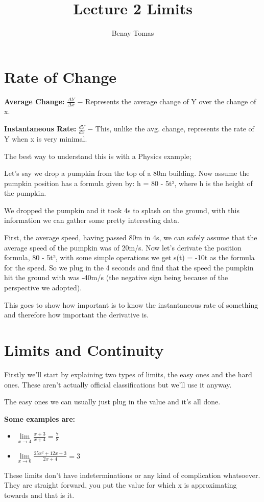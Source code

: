 \documentclass{article}
\title{Lecture 2 Limits}
\author{Benay Tomas}
\begin{document}
\selectfont

\maketitle

\thispagestyle{empty}

\section{Rate of Change}
\textbf{Average Change:} {\large $\frac{\Delta Y}{\Delta x}$} $-$ Represents the average
change of Y over the change of x.

\noindent
\textbf{Instantaneous Rate:} {\large$\frac{dY}{dx}$} $-$ This, unlike the avg. change,
represents the rate of Y when x is very minimal.

The best way to understand this is with a Physics example;

Let's say we drop a pumpkin from the top of a 80m building.
Now assume the pumpkin position has a formula given by: h = 80 - 5t², where
h is the height of the pumpkin.

We dropped the pumpkin and it took 4s to splash on the ground, with this
information we can gather some pretty interesting data. 

First, the average speed, having passed 80m in 4s, we can safely assume
that the average speed of the pumpkin was of 20m/s. Now let's derivate
the position formula, 80 - 5t², with some simple operations we get
s(t) = -10t as the formula for the speed. So we plug in the 4 seconds and
find that the speed the pumpkin hit the ground with was -40m/s (the negative
sign being because of the perspective we adopted).

This goes to show how important is to know the instantaneous rate of something
and therefore how important the derivative is.

\section{Limits and Continuity}
Firstly we'll start by explaining two types of limits, the easy ones and the
hard ones. These aren't actually official classifications but we'll use it
anyway.

The easy ones we can usually just plug in the value and it's all done.

\textbf{Some examples are:}

{\large
\begin{itemize}
    \item[] $\lim\limits_{x \to 4} \frac{x+3}{x+4} =  \frac{7}{8}$
    \item[] $\lim\limits_{x \to 0} \frac{25x^{2} + 12x + 3}{2x + 4} = 3$
\end{itemize}
}
These limits don't have indeterminations or any kind of complication whatsoever.
They are straight forward, you put the value for which x is approximating towards
and that is it.
\end{document}
